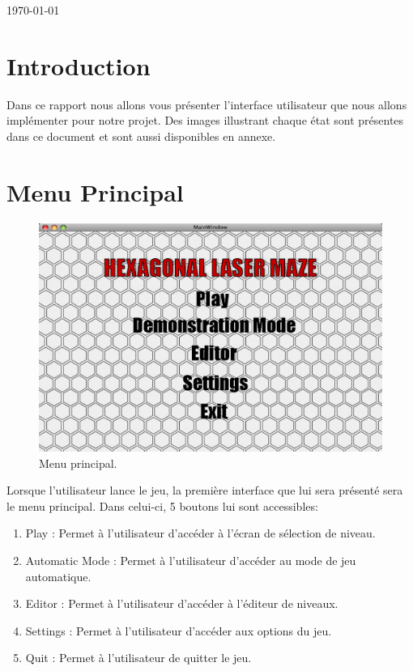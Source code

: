 \documentclass[]{article}
\begin{document}
\maketitle              %

\bigskip
\begin{center} \today \end{center}

\newpage
\section{Introduction}\label{sec:welcome}
Dans ce rapport nous allons vous présenter l'interface utilisateur que nous allons implémenter pour notre projet. Des images illustrant chaque état sont présentes dans ce document et sont aussi disponibles en annexe.

\section{Menu Principal}\label{sec:welcome}

\begin{figure}[!htb]
\begin{center}
  \includegraphics[width=\textwidth]{Welcome.png}
  \caption{Menu principal.}\label{fig:welcome}
\end{center}
\end{figure}

Lorsque l'utilisateur lance le jeu, la première interface que lui sera présenté sera le menu principal. Dans celui-ci, 5 boutons lui sont accessibles:
\begin{enumerate}
\item Play : Permet à l'utilisateur d'accéder à l'écran de sélection de niveau.
\item Automatic Mode : Permet à l'utilisateur d'accéder au mode de jeu automatique.
\item Editor : Permet à l'utilisateur d'accéder à l'éditeur de niveaux.
\item Settings : Permet à l'utilisateur d'accéder aux options du jeu.
\item Quit : Permet à l'utilisateur de quitter le jeu.
\end{enumerate}
\end{document}

